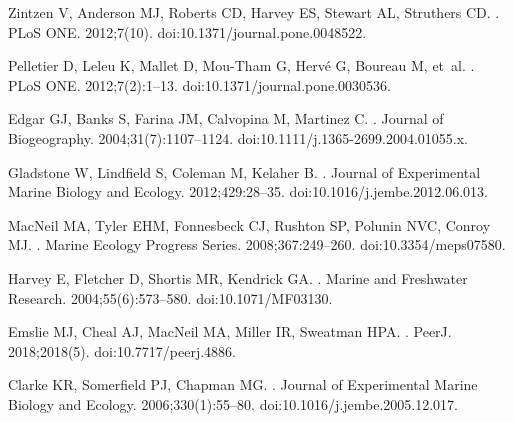 \documentclass[10pt,letterpaper]{article}
\begin{document}
\begin{thebibliography}{10}
Zintzen V, Anderson MJ, Roberts CD, Harvey ES, Stewart AL, Struthers CD.
.
\newblock PLoS ONE. 2012;7(10).
\newblock doi:{10.1371/journal.pone.0048522}.

Pelletier D, Leleu K, Mallet D, Mou-Tham G, Herv{\'{e}} G, Boureau M, et~al.
.
\newblock PLoS ONE. 2012;7(2):1--13.
\newblock doi:{10.1371/journal.pone.0030536}.

Edgar GJ, Banks S, Farina JM, Calvopina M, Martinez C.
.
\newblock Journal of Biogeography. 2004;31(7):1107--1124.
\newblock doi:{10.1111/j.1365-2699.2004.01055.x}.

Gladstone W, Lindfield S, Coleman M, Kelaher B.
.
\newblock Journal of Experimental Marine Biology and Ecology. 2012;429:28--35.
\newblock doi:{10.1016/j.jembe.2012.06.013}.

MacNeil MA, Tyler EHM, Fonnesbeck CJ, Rushton SP, Polunin NVC, Conroy MJ.
.
\newblock Marine Ecology Progress Series. 2008;367:249--260.
\newblock doi:{10.3354/meps07580}.

Harvey E, Fletcher D, Shortis MR, Kendrick GA.
.
\newblock Marine and Freshwater Research. 2004;55(6):573--580.
\newblock doi:{10.1071/MF03130}.

Emslie MJ, Cheal AJ, MacNeil MA, Miller IR, Sweatman HPA.
.
\newblock PeerJ. 2018;2018(5).
\newblock doi:{10.7717/peerj.4886}.

Clarke KR, Somerfield PJ, Chapman MG.
.
\newblock Journal of Experimental Marine Biology and Ecology.
  2006;330(1):55--80.
\newblock doi:{10.1016/j.jembe.2005.12.017}.


\end{thebibliography}
\end{document}
